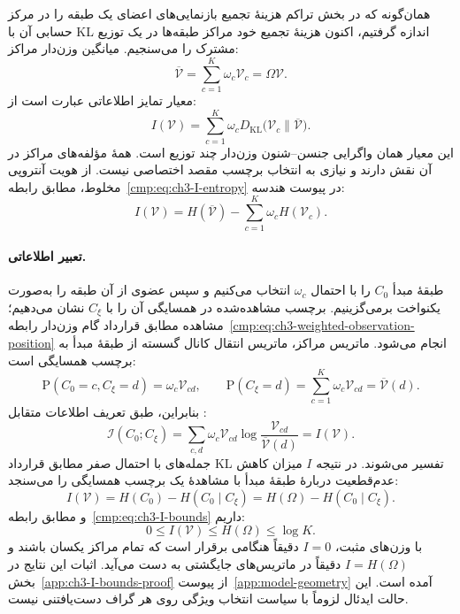 همان‌گونه که در بخش تراکم هزینهٔ تجمیع بازنمایی‌های
اعضای یک طبقه را در مرکز حسابی آن با KL اندازه
گرفتیم، اکنون هزینهٔ تجمیع خود مراکز طبقه‌ها در
یک توزیع مشترک را می‌سنجیم. میانگین وزن‌دار مراکز:
\begin{equation}\label{cmp:eq:ch3-global-center}
\overline{\mathcal V}
=\sum_{c=1}^{K}\omega_c\mathcal V_c
=\Omega\mathcal V.
\end{equation}
معیار تمایز اطلاعاتی عبارت است از:
\begin{equation}\label{cmp:eq:ch3-I-on-V}
\boxed{I(\mathcal V)=
\sum_{c=1}^{K}\omega_c
D_{\mathrm{KL}}\bigl(\mathcal V_c\|\overline{\mathcal V}\bigr).}
\end{equation}
این معیار همان واگرایی جنسن--شنون وزن‌دار چند
توزیع است. همهٔ مؤلفه‌های مراکز در آن نقش دارند و
نیازی به انتخاب برچسب مقصد اختصاصی نیست.
از هویت آنتروپی مخلوط، مطابق
رابطه~\eqref{cmp:eq:ch3-I-entropy} در پیوست هندسه:
\begin{equation*}
\boxed{I(\mathcal V)=H(\overline{\mathcal V})
-\sum_{c=1}^{K}\omega_c H(\mathcal V_c).}
\end{equation*}

\paragraph{تعبیر اطلاعاتی.}
طبقهٔ مبدأ $C_0$ را با احتمال $\omega_c$ انتخاب
می‌کنیم و سپس عضوی از آن طبقه را به‌صورت یکنواخت
برمی‌گزینیم. برچسب مشاهده‌شده در همسایگی آن را با
$C_\xi$ نشان می‌دهیم؛ مشاهده مطابق قرارداد گام
وزن‌دار رابطه~\eqref{cmp:eq:ch3-weighted-observation-position}
انجام می‌شود. ماتریس مراکز، ماتریس انتقال کانال
گسسته از طبقهٔ مبدأ به برچسب همسایگی است:
\begin{equation}\label{cmp:eq:ch3-I-joint-distribution}
\mathrm P(C_0=c,C_\xi=d)=\omega_c\mathcal V_{cd},
\qquad
\mathrm P(C_\xi=d)=\sum_{c=1}^{K}\omega_c\mathcal V_{cd}
=\overline{\mathcal V}(d).
\end{equation}
بنابراین، طبق تعریف اطلاعات متقابل \cite{CoverThomas2006}:
\begin{equation}\label{cmp:eq:ch3-I-mutual-info}
\mathcal I(C_0;C_\xi)=
\sum_{c,d}\omega_c\mathcal V_{cd}
\log\frac{\mathcal V_{cd}}{\overline{\mathcal V}(d)}
=I(\mathcal V).
\end{equation}
جمله‌های با احتمال صفر مطابق قرارداد KL تفسیر
می‌شوند. در نتیجه $I$ میزان کاهش عدم‌قطعیت دربارهٔ
طبقهٔ مبدأ با مشاهدهٔ یک برچسب همسایگی را می‌سنجد:
\begin{equation*}
\boxed{I(\mathcal V)=H(C_0)-H(C_0\mid C_\xi)
=H(\Omega)-H(C_0\mid C_\xi).}
\end{equation*}
و مطابق رابطه~\eqref{cmp:eq:ch3-I-bounds} داریم:
\begin{equation*}
\boxed{0\le I(\mathcal V)\le H(\Omega)\le\log K.}
\end{equation*}
با وزن‌های مثبت، $I=0$ دقیقاً هنگامی برقرار است
که تمام مراکز یکسان باشند و $I=H(\Omega)$ دقیقاً
در ماتریس‌های جایگشتی به دست می‌آید. اثبات این
نتایج در بخش~\ref{app:ch3-I-bounds-proof}
از پیوست~\ref{app:model-geometry} آمده است.
این حالت ایدئال لزوماً با سیاست انتخاب ویژگی روی
هر گراف دست‌یافتنی نیست.

